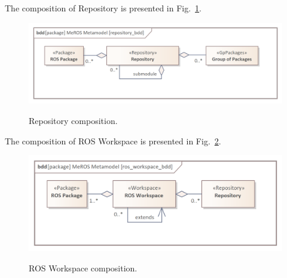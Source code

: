 \documentclass[11pt,oneside,a4paper]{report}
\begin{document}
		
%
	
The composition of Repository is presented in Fig.~\ref{fig:repository_bdd}.	
	
	\begin{figure}[H]
		\centering
		\begin{center}
			{\includegraphics[scale=1.0]{img/meros_pkg/repository_bdd.png}}
		\end{center}
		\caption{Repository composition.} 
		\label{fig:repository_bdd}
	\end{figure}

The composition of ROS Workspace is presented in Fig.~\ref{fig:ros_workspace_bdd}.

	\begin{figure}[H]
		\centering
		\begin{center}
			{\includegraphics[scale=1.0]{img/meros_pkg/ros_workspace_bdd.png}}
		\end{center}
		\caption{ROS Workspace composition.} 
		\label{fig:ros_workspace_bdd}
	\end{figure}
	
\pagebreak
\end{document}
